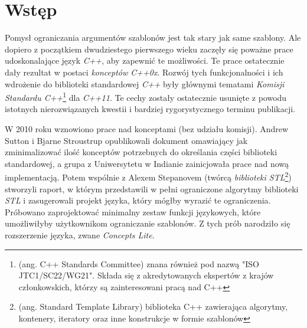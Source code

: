 \documentclass[11pt, a4paper]{article}
\begin{document}
\lstset{language=C++}

\section*{Wstęp}

Pomysł ograniczania argumentów szablonów jest tak stary jak same szablony. Ale dopiero z początkiem dwudziestego pierwszego wieku zaczęły się poważne prace udoskonalające język \emph{C++}, aby zapewnić te możliwości. Te prace ostatecznie dały rezultat w postaci \emph{konceptów C++0x}. Rozwój tych funkcjonalności i ich wdrożenie do biblioteki standardowej \emph{C++} były głównymi tematami \emph{Komisji Standardu C++}\footnote{(ang. C++ Standards Committee) znana również pod nazwą "ISO JTC1/SC22/WG21". Składa się z akredytowanych ekspertów z krajów członkowskich, którzy są zainteresowani pracą nad C++} dla \emph{C++11}. Te cechy zostały ostatecznie usunięte z powodu istotnych nierozwiązanych kwestii i bardziej rygorystycznego terminu publikacji.

W 2010 roku wznowiono prace nad konceptami (bez udziału komisji). Andrew Sutton i Bjarne Stroustrup opublikowali dokument omawiający jak zminimalizować ilość konceptów potrzebnych do określania części biblioteki standardowej, a grupa z Uniwersytetu w Indianie zainicjowała prace nad nową implementacją. Potem wspólnie z Alexem Stepanovem (twórcą \emph{biblioteki STL}\footnote{(ang. Standard Template Library) biblioteka C++ zawierająca algorytmy, kontenery, iteratory oraz inne konstrukcje w formie szablonów}) stworzyli raport, w którym przedstawili w pełni ograniczone algorytmy biblioteki \emph{STL} i zasugerowali projekt języka, który mógłby wyrazić te ograniczenia. Próbowano zaprojektować minimalny zestaw funkcji językowych, które umożliwiłyby użytkownikom ograniczanie szablonów. Z tych prób narodziło się rozszerzenie języka, zwane \emph{Concepts Lite}.

\end{document}

